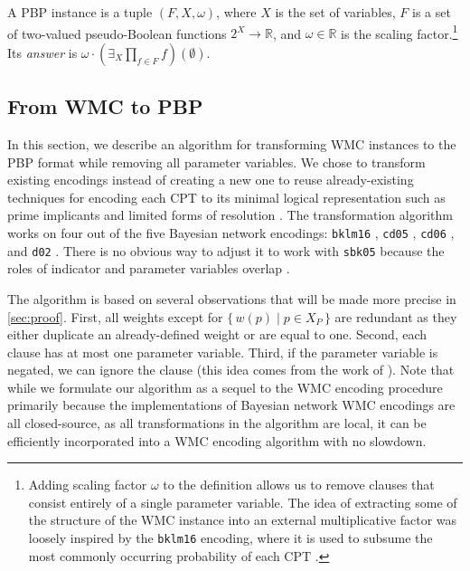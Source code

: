 \begin{definition}\label{def:pbp}
  A PBP instance is a tuple $(F, X, \omega)$, where $X$ is the set of variables,
  $F$ is a set of two-valued pseudo-Boolean functions $2^X \to \mathbb{R}$, and
  $\omega \in \mathbb{R}$ is the scaling factor.\footnote{ Adding scaling factor
    $\omega$ to the definition allows us to remove clauses that consist entirely
    of a single parameter variable. The idea of extracting some of the structure
    of the WMC instance into an external multiplicative factor was loosely
    inspired by the \texttt{bklm16} encoding, where it is used to subsume the
    most commonly occurring probability of each CPT
    \citep{DBLP:conf/ecai/BartKLM16}.} Its \emph{answer} is
  $\omega \cdot \left(\exists_X\prod_{f \in F}f\right)(\emptyset)$.
\end{definition}

\subsection{From WMC to PBP}

In this section, we describe an algorithm for transforming WMC instances to the
PBP format while removing all parameter variables. We chose to transform
existing encodings instead of creating a new one to reuse already-existing
techniques for encoding each CPT to its minimal logical representation such as
prime implicants and limited forms of resolution
\citep{DBLP:conf/ecai/BartKLM16,DBLP:conf/ijcai/ChaviraD05,DBLP:conf/sat/ChaviraD06}.
The transformation algorithm works on four out of the five Bayesian network
encodings: \texttt{bklm16} \citep{DBLP:conf/ecai/BartKLM16}, \texttt{cd05}
\citep{DBLP:conf/ijcai/ChaviraD05}, \texttt{cd06}
\citep{DBLP:conf/sat/ChaviraD06}, and \texttt{d02}
\citep{DBLP:conf/kr/Darwiche02}. There is no obvious way to adjust it to work
with \texttt{sbk05} because the roles of indicator and parameter variables
overlap \citep{DBLP:conf/aaai/SangBK05}.

The algorithm is based on several observations that will be made more precise in
\cref{sec:proof}. First, all weights except for $\{\, w(p) \mid p \in X_P \,\}$
are redundant as they either duplicate an already-defined weight or are equal to
one. Second, each clause has at most one parameter variable. Third, if the
parameter variable is negated, we can ignore the clause (this idea comes from
the work of \citet{DBLP:conf/ijcai/ChaviraD05}). Note that while we formulate
our algorithm as a sequel to the WMC encoding procedure primarily because the
implementations of Bayesian network WMC encodings are all closed-source, as all
transformations in the algorithm are local, it can be efficiently incorporated
into a WMC encoding algorithm with no slowdown.

